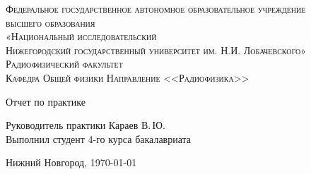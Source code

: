 \begin{titlepage}

\begin{center}

{\small\textsc{Федеральное государственное автономное образовательное учреждение\\
высшего образования\\
«Национальный исследовательский\\
Нижегородский государственный университет им. Н.И. Лобачевского»}}
\vfill
{\small\textsc{Радиофизический факультет}}\\
{\small\textsc {Кафедра Общей физики}}
\vfill
{\small\textsc {Направление <<Радиофизика>>}}

{\Large Отчет по практике \vskip 12pt \bfseries \labtheme}

\end{center}

\vfill
	
\begin{flushleft}
	Руководитель практики Караев В.\,Ю. \\
	Выполнил студент 4-го курса бакалавриата \labauthors
\end{flushleft}
	
\vfill
	
\begin{center}
	Нижний Новгород, \today
\end{center}

\end{titlepage}

